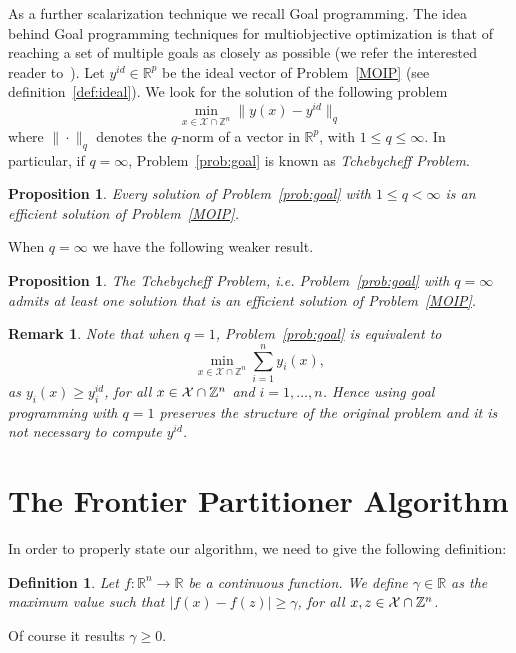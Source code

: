 \documentclass[preprint,12pt]{elsarticle}
\newtheorem{proposition}[theorem]{Proposition}
\newtheorem{definition}[theorem]{Definition}
\newtheorem{remark}[theorem]{Remark}
\def\X{{\cal X}}
\def\R{\mathbb{R}}
\def\Z{\mathbb{Z}}
\begin{document}
As a further scalarization technique we recall Goal programming.
The idea behind Goal programming techniques for multiobjective optimization is that of reaching a set of multiple goals as closely as possible
(we refer the interested reader to~\cite{jones2010practical, miettinen1999nonlinear}).
Let $y^{id}\in \R^p$ be the ideal vector of Problem~\eqref{MOIP} (see definition~\ref{def:ideal}). We look for the solution of the following
problem
\begin{equation}\label{prob:goal}
\min_{x\in \mathcal{X}\cap \Z^n} \|y(x) - y^{id}\|_q
\end{equation}
where $\|\cdot\|_q$ denotes the $q$-norm of a vector in $\R^p$, with $1\leq q\leq \infty$.
In particular, if $q=\infty$, Problem~\eqref{prob:goal} is known as \emph{Tchebycheff Problem}.
\begin{proposition}\label{prop:goal}
Every solution of Problem~\eqref{prob:goal} with $1\leq q< \infty$ is an efficient solution of Problem~\eqref{MOIP}.
\end{proposition}
When $q=\infty$ we have the following weaker result.
\begin{proposition}\label{prop:Tcheb}
The Tchebycheff Problem, i.e. Problem~\eqref{prob:goal} with $q = \infty$ admits at least one solution that is an efficient solution of Problem~\eqref{MOIP}.
\end{proposition}

\begin{remark}\label{rem:q1}
Note that when $q=1$, Problem~\eqref{prob:goal} is equivalent to
\[
\min_{x\in \mathcal{X}\cap \Z^n} \sum_{i=1}^n y_i(x),
\]
as $y_i(x)\geq y_i^{id}$, for all $x\in \X\cap \Z^n$ and $i=1,\ldots,n$. Hence using goal programming with $q=1$ preserves the structure of the original problem and it is not necessary to compute $y^{id}$.
\end{remark}



\section{The Frontier Partitioner Algorithm}\label{sec:FPA}
In order to properly state our algorithm, we need to give the following definition:
%
\begin{definition}\label{def:gammah}
Let $f:\R^n \rightarrow \R$ be a continuous function.
We define  $\gamma \in \R$  as the maximum value such that $| f(x) - f(z) | \ge \gamma$, for all $x,z \in \X\cap \Z^n$.
\end{definition}
Of course it results  $\gamma \ge 0$.
\end{document}
